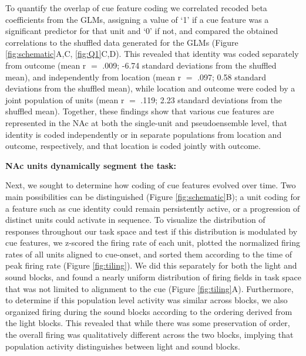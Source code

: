 \documentclass[11pt]{article}
\begin{document}
To quantify the overlap of cue feature coding we correlated recoded beta coefficients from the GLMs, assigning a value of `1' if a cue feature was a significant predictor for that unit and `0' if not, and compared the obtained correlations to the shuffled data generated for the GLMs (Figure \ref{fig:schematic}A,C, \ref{fig:Q1}C,D). This revealed that identity was coded separately from outcome (mean r  $=$ .009; -6.74 standard deviations from the shuffled mean), and independently from location (mean r  $=$ .097;  0.58 standard deviations from the shuffled mean), while location and outcome were coded by a joint population of units (mean r  $=$ .119;  2.23 standard deviations from the shuffled mean). Together, these findings show that various cue features are represented in the NAc at both the single-unit and pseudoensemble level, that identity is coded independently or in separate populations from location and outcome, respectively, and that location is coded jointly with outcome.

{\bf NAc units dynamically segment the task:}

Next, we sought to determine how coding of cue features evolved over
time. Two main possibilities can be distinguished (Figure \ref{fig:schematic}B);
a unit coding for a feature such as cue identity could remain
persistently active, or a progression of distinct units could activate
in sequence. To visualize the distribution of responses throughout our
task space and test if this distribution is modulated by cue features,
we z-scored the firing rate of each unit, plotted the normalized
firing rates of all units aligned to cue-onset, and sorted them
according to the time of peak firing rate (Figure
\ref{fig:tiling}). We did this separately for both the light and sound
blocks, and found a nearly uniform distribution of firing fields in
task space that was not limited to alignment to the cue (Figure
\ref{fig:tiling}A). Furthermore, to determine if this population level
activity was similar across blocks, we also organized firing during
the sound blocks according to the ordering derived from the light
blocks. This revealed that while there was some preservation of order,
the overall firing was qualitatively different across the two blocks,
implying that population activity distinguishes between light and
sound blocks. 
\end{document}

